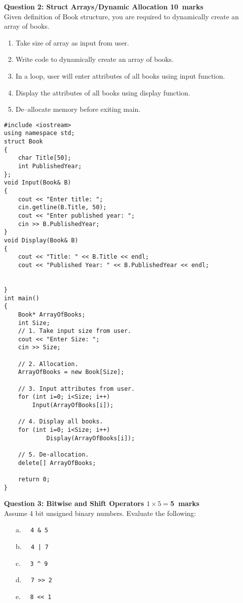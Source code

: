 \documentclass[12pt,a4paper]{article}
\def\Qtwo{10}
\def\Qthree{5}
\begin{document}
\newpage
\noindent\textbf{Question 2: Struct Arrays/Dynamic Allocation \hfill \Qtwo~marks}\\
Given definition of Book structure, you are required to dynamically create an array of books.
\begin{enumerate}
\item Take size of array as input from user.
\item Write code to dynamically create an array of books.
\item In a loop, user will enter attributes of all books using input function.
\item Display the attributes of all books using display function.
\item De--allocate memory before exiting main.
\end{enumerate}
\begin{lstlisting}
#include <iostream>
using namespace std;
struct Book
{
	char Title[50];
	int PublishedYear;
};
void Input(Book& B)
{
	cout << "Enter title: ";
	cin.getline(B.Title, 50);
	cout << "Enter published year: ";
	cin >> B.PublishedYear;
}
void Display(Book& B)
{
	cout << "Title: " << B.Title << endl;
	cout << "Published Year: " << B.PublishedYear << endl;


}
int main()
{
	Book* ArrayOfBooks;
	int Size;
	// 1. Take input size from user.
	cout << "Enter Size: ";	
	cin >> Size;
	
	// 2. Allocation.
	ArrayOfBooks = new Book[Size];
	
	// 3. Input attributes from user.
	for (int i=0; i<Size; i++)	
		Input(ArrayOfBooks[i]);
	
	// 4. Display all books.
	for (int i=0; i<Size; i++)	
			Display(ArrayOfBooks[i]);	
		
	// 5. De-allocation.
	delete[] ArrayOfBooks;
	
	return 0;
}
\end{lstlisting}

\noindent\textbf{Question 3: Bitwise and Shift Operators \hfill $1\times 5=$\Qthree~marks}\\
Assume 4 bit unsigned binary numbers. Evaluate the following:
\begin{enumerate}
\item[a.] \verb|  4 & 5|
\item[b.] \verb$  4 | 7$
\item[c.] \verb|  3 ^ 9|
\item[d.] \verb|  7 >> 2|
\item[e.] \verb|  8 << 1|
\end{enumerate}
\begin{figure}[H]
\end{figure}
\end{document}
